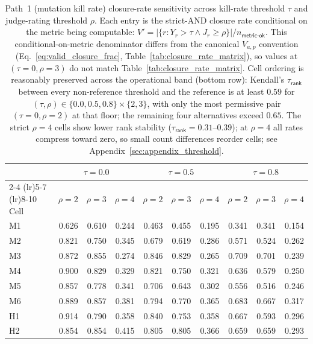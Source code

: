 \begin{table}[!htbp]
\centering
\small
\caption{Path~1 (mutation kill rate) closure-rate sensitivity across kill-rate threshold $\tau$ and judge-rating threshold $\rho$. Each entry is the strict-AND closure rate conditional on the metric being computable: $V' = |\{r : Y_r > \tau \wedge J_r \geq \rho\}| / n_{\textsf{metric-ok}}$. This conditional-on-metric denominator differs from the canonical $V_{a, p}$ convention (Eq.~\ref{eq:valid_closure_frac}, Table~\ref{tab:closure_rate_matrix}), so values at $(\tau = 0, \rho = 3)$ do not match Table~\ref{tab:closure_rate_matrix}. Cell ordering is reasonably preserved across the operational band (bottom row): Kendall's $\tau_{\textsf{rank}}$ between every non-reference threshold and the reference is at least $0.59$ for $(\tau, \rho) \in \{0.0, 0.5, 0.8\} \times \{2, 3\}$, with only the most permissive pair $(\tau = 0, \rho = 2)$ at that floor; the remaining four alternatives exceed $0.65$. The strict $\rho = 4$ cells show lower rank stability ($\tau_{\textsf{rank}} = 0.31$--$0.39$); at $\rho = 4$ all rates compress toward zero, so small count differences reorder cells; see Appendix~\ref{sec:appendix_threshold}.}
\label{tab:threshold_sensitivity_path1}
\begin{tabular*}{\linewidth}{@{\extracolsep{\fill}}l*{9}{r}@{}}
\toprule
& \multicolumn{3}{c}{$\tau = 0.0$} & \multicolumn{3}{c}{$\tau = 0.5$} & \multicolumn{3}{c}{$\tau = 0.8$} \\
\cmidrule(lr){2-4} \cmidrule(lr){5-7} \cmidrule(lr){8-10}
Cell & $\rho=2$ & $\rho=3$ & $\rho=4$ & $\rho=2$ & $\rho=3$ & $\rho=4$ & $\rho=2$ & $\rho=3$ & $\rho=4$ \\
\midrule
M1  & 0.626 & 0.610 & 0.244 & 0.463 & 0.455 & 0.195 & 0.341 & 0.341 & 0.154 \\
M2  & 0.821 & 0.750 & 0.345 & 0.679 & 0.619 & 0.286 & 0.571 & 0.524 & 0.262 \\
M3  & 0.872 & 0.855 & 0.274 & 0.846 & 0.829 & 0.265 & 0.709 & 0.701 & 0.239 \\
M4  & 0.900 & 0.829 & 0.329 & 0.821 & 0.750 & 0.321 & 0.636 & 0.579 & 0.250 \\
M5  & 0.857 & 0.778 & 0.341 & 0.706 & 0.643 & 0.302 & 0.556 & 0.516 & 0.246 \\
M6  & 0.889 & 0.857 & 0.381 & 0.794 & 0.770 & 0.365 & 0.683 & 0.667 & 0.317 \\
H1  & 0.914 & 0.790 & 0.358 & 0.840 & 0.753 & 0.358 & 0.667 & 0.593 & 0.296 \\
H2  & 0.854 & 0.854 & 0.415 & 0.805 & 0.805 & 0.366 & 0.659 & 0.659 & 0.293 \\

\end{tabular*}
\end{table}
